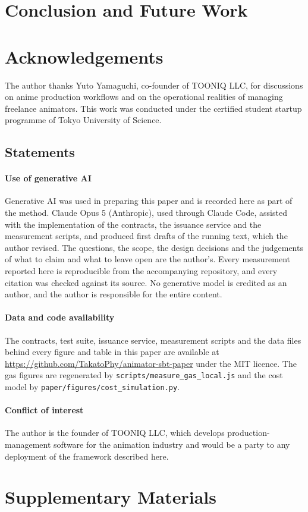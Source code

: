 \documentclass[conference]{IEEEtran}
\begin{document}
\section{Conclusion and Future Work}
\label{sec:conclusion}


\section*{Acknowledgements}
The author thanks Yuto Yamaguchi, co-founder of TOONIQ LLC, for discussions on
anime production workflows and on the operational realities of managing freelance
animators. This work was conducted under the certified student startup programme
of Tokyo University of Science.

\subsection*{Statements}

\paragraph*{Use of generative AI}
Generative AI was used in preparing this paper and is recorded here as part of the
method. Claude Opus 5 (Anthropic), used through Claude Code, assisted with the
implementation of the contracts, the issuance service and the measurement scripts,
and produced first drafts of the running text, which the author revised. The
questions, the scope, the design decisions and the judgements of what to claim and
what to leave open are the author's. Every measurement reported here is
reproducible from the accompanying repository, and every citation was checked
against its source. No generative model is credited as an author, and the author
is responsible for the entire content.

\paragraph*{Data and code availability}
The contracts, test suite, issuance service, measurement scripts and the data
files behind every figure and table in this paper are available at
\url{https://github.com/TakatoPhy/animator-sbt-paper} under the MIT licence. The
gas figures are regenerated by \texttt{scripts/measure\_gas\_local.js} and the cost
model by \texttt{paper/figures/cost\_simulation.py}.

\paragraph*{Conflict of interest}
The author is the founder of TOONIQ LLC, which develops production-management
software for the animation industry and would be a party to any deployment of the
framework described here.




\appendix
\section{Supplementary Materials}
\label{sec:appendix}

\end{document}
